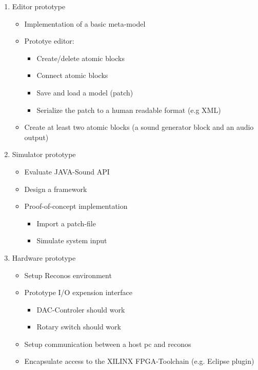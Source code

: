 \begin{enumerate}
	\item Editor prototype
		\begin{itemize}
			\item Implementation of a basic meta-model
			\item Prototye editor:
				\begin{itemize}
					\item Create/delete atomic blocks
					\item Connect atomic blocks
					\item Save and load a model (patch)
					\item Serialize the patch to a human readable format (e.g XML)
				\end{itemize}
			\item Create at least two atomic blocks (a sound generator block and an audio output)
		\end{itemize}
	\item Simulator prototype
		\begin{itemize}
			\item Evaluate JAVA-Sound API
			\item Design a framework
			\item Proof-of-concept implementation
			\begin{itemize}
				\item Import a patch-file
				\item Simulate system input
			\end{itemize}
		\end{itemize}
	\item Hardware prototype
		\begin{itemize}
			\item Setup Reconos environment
			\item Prototype I/O expension interface
			\begin{itemize}
				\item DAC-Controler should work
				\item Rotary switch should work
			\end{itemize}
			\item Setup communication between a host pc and reconos
			\item Encapsulate access to the XILINX FPGA-Toolchain (e.g. Eclipse plugin)
		\end{itemize}
\end{enumerate}


